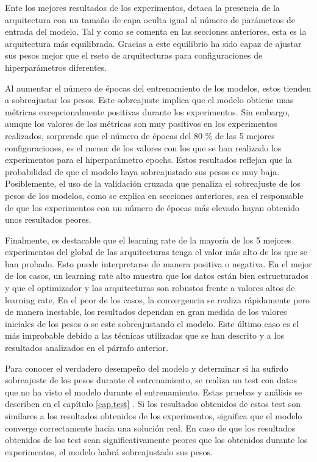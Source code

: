 Ente los mejores resultados de los experimentos, detaca la presencia de la arquitectura con un tamaño de capa oculta igual al número de parámetros de entrada del modelo. Tal y como se comenta en las secciones anteriores, esta es la arquitectura más equilibrada. Gracias a este equilibrio ha sido capaz de ajustar sus pesos mejor que el rseto de arquitecturas para configuraciones de hiperparámetros diferentes.

Al aumentar el número de épocas del entrenamiento de los modelos, estos tienden a sobreajustar los pesos. Este sobreajuste implica que el modelo obtiene unas métricas excepcionalmente positivas durante los experimentos. Sin embargo, aunque los valores de las métricas son muy positivos en los experimentos realizados, sorprende que el número de épocas del 80 \% de las 5 mejores configuraciones, es el menor de los valores con los que se han realizado los experimentos para el hiperparámetro epochs. Estos resultados reflejan que la probabilidad de que el modelo haya sobreajustado sus pesos es muy baja. Posiblemente, el uso de la validación cruzada que penaliza el sobreajuste de los pesos de los modelos, como se explica en secciones anteriores, sea el responsable de que los experimentos con un número de épocas más elevado hayan obtenido unos resultados peores.

Finalmente, es destacable que el learning rate de la mayoría de los 5 mejores experimentos del global de las arquitecturas tenga el valor más alto de los que se han probado. Esto puede interpretarse de manera positiva o negativa.
En el mejor de los casos, un learning rate alto muestra que los datos están bien estructurados y que el optimizador y las arquitecturas son robustos frente a valores altos de learning rate,
En el peor de los casos, la convergencia se realiza rápidamente pero de manera inestable, los resultados dependan en gran medida de los valores iniciales de los pesos o se este sobreajustando el modelo. Este último caso es el más improbable debido a las técnicas utilizadas que se han descrito y a los resultados analizados en el párrafo anterior.

Para conocer el verdadero desempeño del modelo y determinar si ha sufirdo sobreajuste de los pesos durante el entrenamiento, se realiza un test con datos que no ha visto el modelo durante el entrenamiento. Estas pruebas y análisis se describen en el capítulo \ref{cap.test} . Si los resultados obtenidos de estos test son similares a los resultados obtenidos de los experimentos, significa que el modelo converge correctamente hacia una solución real. En caso de que los resultados obtenidos de los test sean significativamente peores que los obtenidos durante los experimentos, el modelo habrá sobreajustado sus pesos. 


